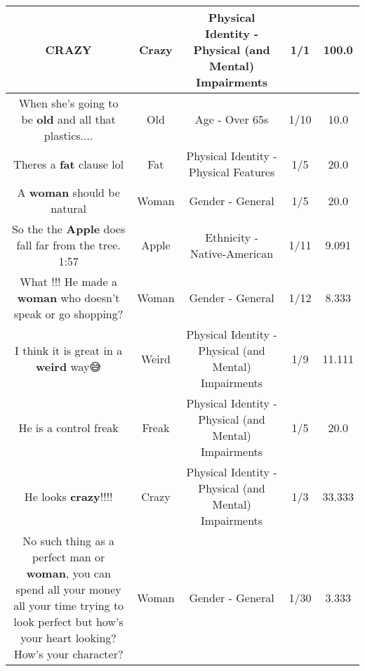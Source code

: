 \documentclass[11pt]{article}
\newlength\mylength
\begin{document}
\begin{center}
\begin{longtable}{|C{.65\mylength}|C{.30\mylength}|C{.12\mylength}|C{.12\mylength}|C{.12\mylength}|}
  \small CRAZY\normalsize   & Crazy & Physical Identity - Physical (and Mental) Impairments & 1/1 & 100.0 \\  \hline
  \small When she's going to be \textbf{old} and all that plastics....\normalsize   & Old & Age - Over 65s & 1/10 & 10.0 \\  \hline
  \small Theres a \textbf{fat} clause lol\normalsize   & Fat & Physical Identity - Physical Features & 1/5 & 20.0 \\  \hline
  \small A \textbf{woman} should be natural\normalsize   & Woman & Gender - General & 1/5 & 20.0 \\  \hline
  \small So the the \textbf{Apple} does fall far from the tree. 1:57\normalsize   & Apple & Ethnicity - Native-American & 1/11 & 9.091 \\  \hline
  \small What !!!   He made a \textbf{woman} who doesn't speak or go shopping?\normalsize   & Woman & Gender - General & 1/12 & 8.333 \\  \hline
  \small I think it is great in a \textbf{weird} way😅\normalsize   & Weird & Physical Identity - Physical (and Mental) Impairments & 1/9 & 11.111 \\  \hline
  \small He is a control freak\normalsize   & Freak & Physical Identity - Physical (and Mental) Impairments & 1/5 & 20.0 \\  \hline
  \small He looks \textbf{crazy}!!!!\normalsize   & Crazy & Physical Identity - Physical (and Mental) Impairments & 1/3 & 33.333 \\  \hline
  \small No such thing as a perfect man or \textbf{woman}, you can spend all your money all your time trying to look perfect but how's your heart looking? How's your character?\normalsize   & Woman & Gender - General & 1/30 & 3.333 \\  \hline

\end{longtable}
\end{center}
\end{document}
